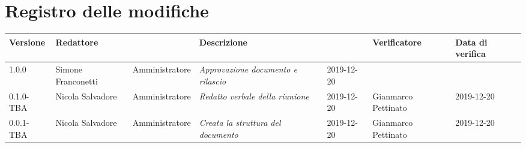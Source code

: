\section*{Registro delle modifiche}
\renewcommand{\arraystretch}{1.8}
  \setlength\LTleft{-1.7cm}
  \begin{longtable}{|p{1.7cm}|p{2cm}|p{2.5cm}|p{3cm}|p{1.7cm}|p{2cm}|p{2.3cm}|}
    \hline
    \rowcolor{header}
    \textbf{Versione} & \textbf{Redattore} & \centering{\textbf{Ruolo}} & \textbf{Descrizione} &      \centering{\textbf{Data}} & \textbf{Verificatore} & \textbf{Data di verifica} \\
    \hline
    1.0.0 & Simone Franconetti & Amministratore & \small{\textit{Approvazione documento e rilascio}} & 2019-12-20 & & \\
    0.1.0-TBA & Nicola Salvadore & Amministratore & \small{\textit{Redatto verbale della riunione}} & 2019-12-20 & Gianmarco Pettinato & 2019-12-20 \\
    0.0.1-TBA & Nicola Salvadore & Amministratore & \small{\textit{Creata la struttura del documento}} & 2019-12-20 & Gianmarco Pettinato & 2019-12-20 \\

    \hline
  \end{longtable}
  \setlength\LTleft{0cm}
